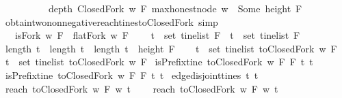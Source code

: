 \begin{isabellebody}
\ \ \ \ \ \ \ \ \ \ depth\ {\isacharparenleft}ClosedFork\ w\ F{\isacharparenright}\ {\isacharparenleft}max{\isacharunderscore}honest{\isacharunderscore}node\ w{\isacharparenright}\ {\isacharequal}\ Some\ {\isacharparenleft}height\ F{\isacharparenright}{\isachardoublequoteclose}\isanewline
%
\isadelimproof
\ \ %
\endisadelimproof
%
\isatagproof
{}\isamarkupfalse%
%
\endisatagproof
{\isafoldproof}%
%
\isadelimproof
\isanewline
%
\endisadelimproof
\ \ \ \ \isanewline
{}\isamarkupfalse%
\ obtain{\isacharunderscore}two{\isacharunderscore}non{\isacharunderscore}negative{\isacharunderscore}reach{\isacharunderscore}tines{\isacharunderscore}toClosedFork\ {\isacharbrackleft}simp{\isacharbrackright}{\isacharcolon}\ \isanewline
\ \ \ {\isachardoublequoteopen}isFork\ w\ F\ {\isasymand}\ flatFork\ w\ F{\isachardoublequoteclose}\ \isanewline
\ \ \ {\isachardoublequoteopen}t{}\ {\isasymin}\ set\ {\isacharparenleft}tinelist\ F{\isacharparenright}\ {\isasymand}\ t{}\ {\isasymin}\ set\ {\isacharparenleft}tinelist\ F{\isacharparenright}\ \isanewline
{\isasymand}\ length\ t{}\ {\isacharequal}\ length\ t{}\ {\isasymand}\ length\ t{}\ {\isacharequal}\ height\ F\ \isanewline
{\isasymlongrightarrow}\ \isanewline
{\isacharparenleft}{\isasymexists}\ t{}{\isacharprime}\ {\isasymin}\ set\ {\isacharparenleft}tinelist\ {\isacharparenleft}toClosedFork\ w\ F{\isacharparenright}{\isacharparenright}{\isachardot}\ \isanewline
{\isasymexists}\ t{}{\isacharprime}\ {\isasymin}\ set\ {\isacharparenleft}tinelist\ {\isacharparenleft}toClosedFork\ w\ F{\isacharparenright}{\isacharparenright}{\isachardot}\ \isanewline
isPrefix{\isacharunderscore}tine\ {\isacharparenleft}toClosedFork\ w\ F{\isacharparenright}\ F\ t{}{\isacharprime}\ t{}\ \isanewline
{\isasymand}\ isPrefix{\isacharunderscore}tine\ {\isacharparenleft}toClosedFork\ w\ F{\isacharparenright}\ F\ t{}{\isacharprime}\ t{}\isanewline
{\isasymand}\ edge{\isacharunderscore}disjoint{\isacharunderscore}tines\ t{}{\isacharprime}\ t{}{\isacharprime}\ \isanewline
{\isasymand}\ reach\ {\isacharparenleft}toClosedFork\ w\ F{\isacharparenright}\ w\ t{}{\isacharprime}\ {\isasymge}\ {}\ \isanewline
{\isasymand}\ reach\ {\isacharparenleft}toClosedFork\ w\ F{\isacharparenright}\ w\ t{}{\isacharprime}\ {\isasymge}\ {}{\isacharparenright}{\isachardoublequoteclose}\ \ \isanewline
%
\isadelimproof

\end{isabellebody}
